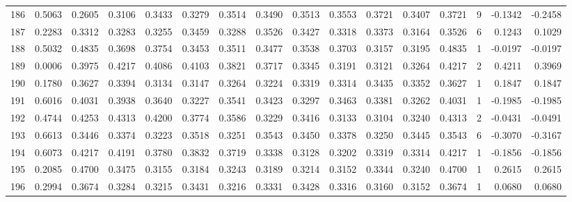 \begin{tabular}{lrrrrrrrrrrrrrrr}
186 &      0.5063 &  0.2605 &  0.3106 &  0.3433 &  0.3279 &  0.3514 &  0.3490 &  0.3513 &  0.3553 &  0.3721 &   0.3407 &     0.3721 &      9 &                   -0.1342 &                    -0.2458 \\
187 &      0.2283 &  0.3312 &  0.3283 &  0.3255 &  0.3459 &  0.3288 &  0.3526 &  0.3427 &  0.3318 &  0.3373 &   0.3164 &     0.3526 &      6 &                    0.1243 &                     0.1029 \\
188 &      0.5032 &  0.4835 &  0.3698 &  0.3754 &  0.3453 &  0.3511 &  0.3477 &  0.3538 &  0.3703 &  0.3157 &   0.3195 &     0.4835 &      1 &                   -0.0197 &                    -0.0197 \\
189 &      0.0006 &  0.3975 &  0.4217 &  0.4086 &  0.4103 &  0.3821 &  0.3717 &  0.3345 &  0.3191 &  0.3121 &   0.3264 &     0.4217 &      2 &                    0.4211 &                     0.3969 \\
190 &      0.1780 &  0.3627 &  0.3394 &  0.3134 &  0.3147 &  0.3264 &  0.3224 &  0.3319 &  0.3314 &  0.3435 &   0.3352 &     0.3627 &      1 &                    0.1847 &                     0.1847 \\
191 &      0.6016 &  0.4031 &  0.3938 &  0.3640 &  0.3227 &  0.3541 &  0.3423 &  0.3297 &  0.3463 &  0.3381 &   0.3262 &     0.4031 &      1 &                   -0.1985 &                    -0.1985 \\
192 &      0.4744 &  0.4253 &  0.4313 &  0.4200 &  0.3774 &  0.3586 &  0.3229 &  0.3416 &  0.3133 &  0.3104 &   0.3240 &     0.4313 &      2 &                   -0.0431 &                    -0.0491 \\
193 &      0.6613 &  0.3446 &  0.3374 &  0.3223 &  0.3518 &  0.3251 &  0.3543 &  0.3450 &  0.3378 &  0.3250 &   0.3445 &     0.3543 &      6 &                   -0.3070 &                    -0.3167 \\
194 &      0.6073 &  0.4217 &  0.4191 &  0.3780 &  0.3832 &  0.3719 &  0.3338 &  0.3128 &  0.3202 &  0.3319 &   0.3314 &     0.4217 &      1 &                   -0.1856 &                    -0.1856 \\
195 &      0.2085 &  0.4700 &  0.3475 &  0.3155 &  0.3184 &  0.3243 &  0.3189 &  0.3214 &  0.3152 &  0.3344 &   0.3240 &     0.4700 &      1 &                    0.2615 &                     0.2615 \\
196 &      0.2994 &  0.3674 &  0.3284 &  0.3215 &  0.3431 &  0.3216 &  0.3331 &  0.3428 &  0.3316 &  0.3160 &   0.3152 &     0.3674 &      1 &                    0.0680 &                     0.0680 \\

\end{tabular}

